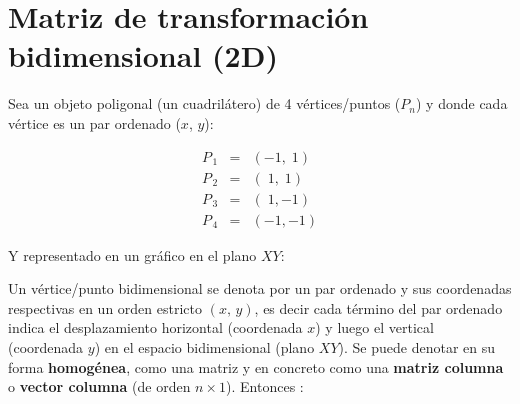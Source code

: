 \documentclass[10pt, twocolumn, landscape, a4paper]{article}
\begin{document}
\section*{Matriz de transformación bidimensional (2D)}
\noindent Sea un objeto poligonal (un cuadrilátero) de 4 vértices/puntos ($P_{n}$) y donde cada vértice es un par ordenado ($x$, $y$):

\begin{eqnarray*}
P_{\,1} &=& (-1, \;1) \\
P_{\,2} &=& (\;1, \;1) \\
P_{\,3} &=& (\;1, -1) \\
P_{\,4} &=& (-1, -1) 
\end{eqnarray*}

Y representado en un gráfico en el plano $XY$: 
\begin{center}
\end{center}

\noindent Un vértice/punto bidimensional se denota por un par ordenado y sus coordenadas respectivas en un orden estricto $(x,\,y)$, es decir cada término del par ordenado indica el desplazamiento horizontal (coordenada $x$) y luego el vertical (coordenada $y$) en el espacio bidimensional (plano $XY$). Se puede denotar en su forma \textbf{homogénea}, como una matriz y en concreto como una \textbf{matriz columna} o \textbf{vector columna} (de orden $n{\times}1$). Entonces :
\end{document}
